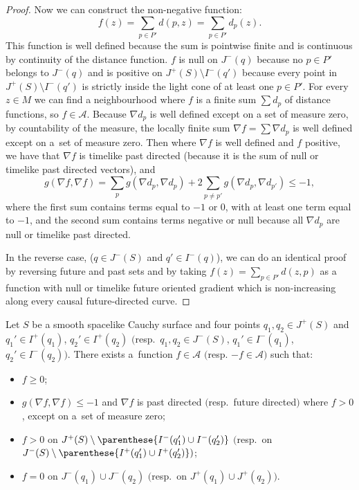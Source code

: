 \begin{proof}
Now we can construct the non-negative function:
\[
f(z) = \sum_{p \in P'} d(p,z) = \sum_{p \in P'} d_p(z).
\]
This function is well def\/ined because the sum is pointwise f\/inite and is continuous by continuity of the distance function. $f$ is null on $J^-(q)$ because no $p \in P'$ belongs to $J^-(q)$ and is positive on $J^+(S) \setminus I^-(q')$ because every point in $J^+(S) \setminus I^-(q')$ is strictly inside the light cone of at least one $p \in P'$. For every $z \in M$ we can f\/ind a neighbourhood where $f$ is  a f\/inite sum $\sum d_p$ of distance functions, so $f\in\mathcal A$. Because $\nabla d_p$ is well def\/ined except on a set of measure zero, by countability of the measure, the locally f\/inite sum $\nabla f = \sum \nabla d_p$ is well def\/ined except on a~set of measure zero. Then where $\nabla f$ is well def\/ined and $f$ positive, we have that $\nabla f$ is timelike past directed (because it is the sum of null or timelike past directed vectors), and
\[
g( \nabla f, \nabla f ) =  \sum_{p} g( \nabla d_p, \nabla d_p ) +  2 \sum_{p \neq p'} g( \nabla d_p, \nabla d_{p'} ) \leq -1,
\]
where the f\/irst sum contains terms equal to $-1$ or $0$, with at least one term equal to $-1$, and the second sum contains terms negative or null because all $\nabla d_p$ are null or timelike past directed.

In the reverse case, ($q \in J^-(S)$ and $q' \in I^-(q)$), we can do an identical proof by reversing future and past sets and by taking $f(z) = \sum_{p \in P'} d(z,p)$ as a function with null or timelike future oriented gradient which is non-increasing along every causal future-directed curve.
\end{proof}

\begin{corollary}\label{corollaryprincipal}
Let $S$ be a smooth spacelike Cauchy surface and four points $q_1,q_2 \in J^+(S)$ and $q_1' \in I^+(q_1)$, $q_2' \in I^+(q_2)$ $($resp.\ $q_1,q_2 \in J^-(S)$, $q_1' \in I^-(q_1)$, $q_2' \in I^-(q_2))$. There exists a~function $f \in \mathcal A$ $($resp. $-f \in \mathcal A)$ such that:
\begin{itemize}\itemsep=0pt
\item $f \geq 0 $;
\item $g( \nabla f, \nabla f ) \leq -1$ and $\nabla f$ is past directed $($resp.\ future directed$)$ where $f > 0$, except on a~set of measure zero;
\item $f > 0$ on $J^+(S) \setminus \parenthese{I^-(q_1') \cup I^-(q_2')}$ $($resp.\ on $J^-(S) \setminus \parenthese{I^+(q_1') \cup I^+(q_2')})$;
\item $f = 0$ on $J^-(q_1) \cup J^-(q_2)$ $($resp.\ on $J^+(q_1) \cup J^+(q_2))$.
\end{itemize}
\end{corollary}

